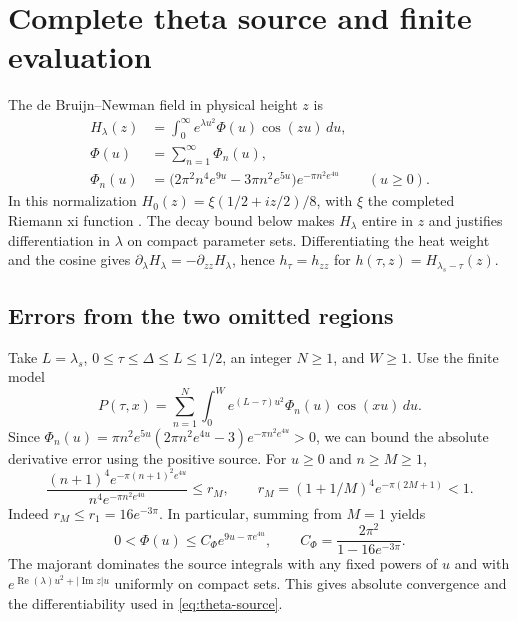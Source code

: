 \section{Complete theta source and finite evaluation}\label{sec:theta}

The de Bruijn--Newman field in physical height \(z\) is
\begin{equation}\label{eq:theta-source}
\begin{aligned}
H_\lambda(z)&=\int_0^\infty e^{\lambda u^2}\Phi(u)\cos(zu)\,du,\\
\Phi(u)&=\sum_{n=1}^\infty\Phi_n(u),\\
\Phi_n(u)&=\bigl(2\pi^2 n^4 e^{9u}-3\pi n^2 e^{5u}\bigr)
                     e^{-\pi n^2 e^{4u}}\qquad (u\ge 0).
\end{aligned}
\end{equation}
In this normalization \(H_0(z)=\xi(1/2+iz/2)/8\), with \(\xi\)
the completed Riemann xi function \cite[eqs.~(1)--(4)]{RodgersTao}.
The decay bound below makes \(H_\lambda\) entire in \(z\) and
justifies differentiation in \(\lambda\) on compact parameter sets.
Differentiating the heat weight and the cosine gives
\(\partial_\lambda H_\lambda=-\partial_{zz}H_\lambda\), hence
\(h_\tau=h_{zz}\) for \(h(\tau,z)=H_{\lambda_s-\tau}(z)\).

\subsection{Errors from the two omitted regions}

Take \(L=\lambda_s\), \(0\le \tau\le\Delta\le L\le 1/2\), an
integer \(N\ge 1\), and \(W\ge 1\). Use the finite model
\begin{equation}\label{eq:finite-theta-model}
P(\tau,x)=\sum_{n=1}^N \int_0^W
          e^{(L-\tau)u^2}\Phi_n(u)\cos(xu)\,du .
\end{equation}
Since
\(\Phi_n(u)=\pi n^2 e^{5u}(2\pi n^2 e^{4u}-3)e^{-\pi n^2 e^{4u}}>0\),
we can bound the absolute derivative error using the positive
source. For \(u\ge 0\) and \(n\ge M\ge 1\),
\[
\frac{(n+1)^4 e^{-\pi(n+1)^2 e^{4u}}}
     {n^4 e^{-\pi n^2 e^{4u}}}
\le r_M,\qquad
r_M=(1+1/M)^4 e^{-\pi(2M+1)}<1 .
\]
Indeed \(r_M\le r_1=16e^{-3\pi}\). In particular, summing from
\(M=1\) yields
\begin{equation}\label{eq:theta-density-majorant}
0<\Phi(u)\le C_\Phi e^{9u-\pi e^{4u}},
\qquad C_\Phi=\frac{2\pi^2}{1-16e^{-3\pi}} .
\end{equation}
The majorant dominates the source integrals with any fixed powers of
\(u\) and with \(e^{\operatorname{Re}(\lambda)u^2+|\operatorname{Im}z|u}\)
uniformly on compact sets. This gives absolute convergence and the
differentiability used in \eqref{eq:theta-source}.

